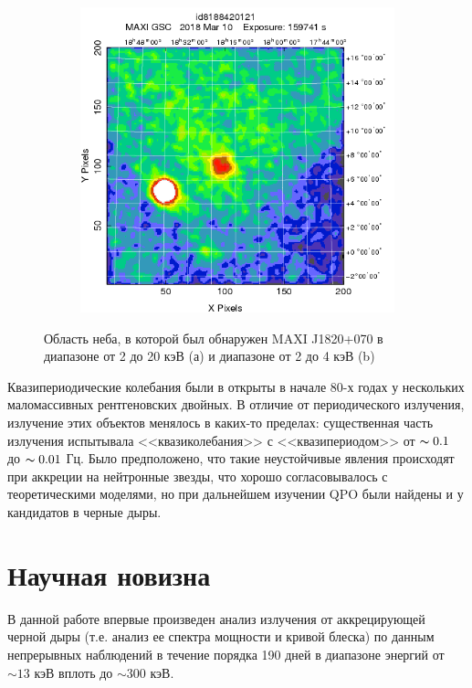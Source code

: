 \begin{figure}[h!]
\begin{subfigure}[b]{0.49\linewidth}
			\includegraphics[width = \textwidth]{pictures/maxij_image.png}
			\caption{}
			\label{img:bhpart}
		\end{subfigure}
		\caption{Область неба, в которой был обнаружен MAXI J1820+070 в диапазоне от 2 до 20 кэВ (а) и диапазоне от 2 до 4 кэВ (b)}
		\label{img:bh}
	\end{figure}
	
	Квазипериодические колебания были в открыты в начале 80-х годах у нескольких маломассивных рентгеновских двойных. В отличие от периодического излучения, излучение этих объектов менялось в каких-то пределах: существенная часть излучения испытывала <<квазиколебания>> с <<квазипериодом>> от $\thicksim 0.1$ до $\thicksim 0.01$ Гц. Было предположено, что такие неустойчивые явления происходят при аккреции на нейтронные звезды, что хорошо согласовывалось с теоретическими моделями, но при дальнейшем изучении QPO были найдены и у кандидатов в черные дыры.
	
\section*{Научная новизна}
	
	В данной работе впервые произведен анализ излучения от аккрецирующей черной дыры (т.е. анализ ее спектра мощности и кривой блеска) по данным непрерывных наблюдений в течение порядка 190 дней в диапазоне энергий от $\sim13$ кэВ вплоть до $\sim300$ кэВ.
